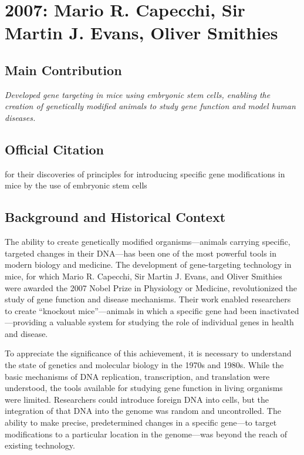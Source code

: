 \chapter[2007 --- Capecchi et al.]{2007: Mario R. Capecchi, Sir Martin J. Evans, Oliver Smithies}
\label{ch:2007_Capecchi}

\section*{Main Contribution}

\textit{Developed gene targeting in mice using embryonic stem cells, enabling the creation of genetically modified animals to study gene function and model human diseases.}\cite{nobel-2007,lecture-2007}

\section{Official Citation}

for their discoveries of principles for introducing specific gene modifications in mice by the use of embryonic stem cells

\section{Background and Historical Context}

The ability to create genetically modified organisms---animals carrying specific, targeted changes in their DNA---has been one of the most powerful tools in modern biology and medicine. The development of gene-targeting technology in mice, for which Mario R. Capecchi, Sir Martin J. Evans, and Oliver Smithies were awarded the 2007 Nobel Prize in Physiology or Medicine, revolutionized the study of gene function and disease mechanisms. Their work enabled researchers to create ``knockout mice''---animals in which a specific gene had been inactivated---providing a valuable system for studying the role of individual genes in health and disease.

To appreciate the significance of this achievement, it is necessary to understand the state of genetics and molecular biology in the 1970s and 1980s. While the basic mechanisms of DNA replication, transcription, and translation were understood, the tools available for studying gene function in living organisms were limited. Researchers could introduce foreign DNA into cells, but the integration of that DNA into the genome was random and uncontrolled. The ability to make precise, predetermined changes in a specific gene---to target modifications to a particular location in the genome---was beyond the reach of existing technology.

